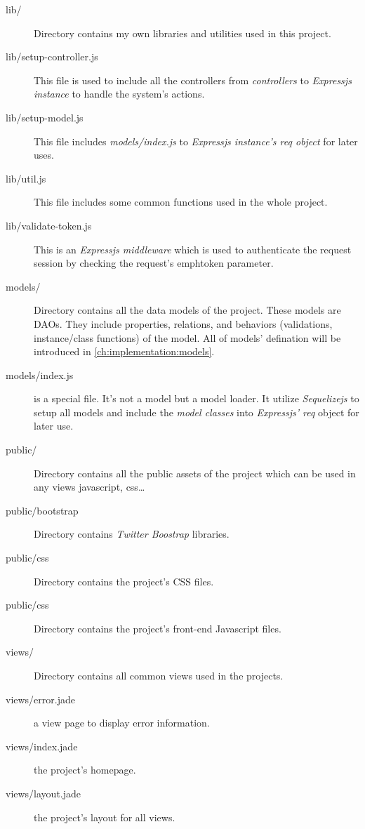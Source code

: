 \begin{description}
\item[lib/] Directory contains my own libraries and utilities used in this project.
\item[lib/setup-controller.js] This file is used to include all the controllers from \emph{controllers} to \emph{Expressjs instance} to handle the system's actions.
\item[lib/setup-model.js] This file includes \emph{models/index.js} to \emph{Expressjs instance's req object} for later uses.
\item[lib/util.js] This file includes some common functions used in the whole project.
\item[lib/validate-token.js] This is an \emph{Expressjs middleware} which is used to authenticate the request session by checking the request's emph{token} parameter.

\item[models/] Directory contains all the data models of the project.
These models are DAOs.
They include properties, relations, and behaviors (\eg validations, instance/class functions) of the model.
All of models' defination will be introduced in \autoref{ch:implementation:models}.
\item[models/index.js] is a special file.
It's not a model but a model loader.
It utilize \emph{Sequelizejs} to setup all models and include the \emph{model classes} into \emph{Expressjs' req} object for later use.

\item[public/] Directory contains all the public assets of the project which can be used in any views \eg javascript, css\dots
\item[public/bootstrap] Directory contains \emph{Twitter Boostrap} libraries.
\item[public/css] Directory contains the project's CSS files.
\item[public/css] Directory contains the project's front-end Javascript files.

\item[views/] Directory contains all common views used in the projects.
\item[views/error.jade] a view page to display error information.
\item[views/index.jade] the project's homepage.
\item[views/layout.jade] the project's layout for all views.


\end{description}

